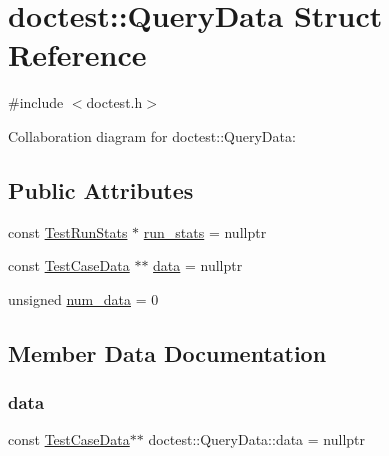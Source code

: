 \hypertarget{structdoctest_1_1_query_data}{}\section{doctest\+:\+:Query\+Data Struct Reference}
\label{structdoctest_1_1_query_data}


{\ttfamily \#include $<$doctest.\+h$>$}



Collaboration diagram for doctest\+:\+:Query\+Data\+:
\subsection*{Public Attributes}
\begin{DoxyCompactItemize}
\item 
const \hyperlink{structdoctest_1_1_test_run_stats}{Test\+Run\+Stats} $\ast$ \hyperlink{structdoctest_1_1_query_data_a435f443f389323f47cb8b0e4202bbea9}{run\+\_\+stats} = nullptr
\item 
const \hyperlink{structdoctest_1_1_test_case_data}{Test\+Case\+Data} $\ast$$\ast$ \hyperlink{structdoctest_1_1_query_data_a8085a29db9a1cd5c7eff22ef44e9a9e8}{data} = nullptr
\item 
unsigned \hyperlink{structdoctest_1_1_query_data_af1033338fe975ae3c19b16452401230d}{num\+\_\+data} = 0
\end{DoxyCompactItemize}


\subsection{Member Data Documentation}
\mbox{\label{structdoctest_1_1_query_data_a8085a29db9a1cd5c7eff22ef44e9a9e8}} 
\subsubsection{\texorpdfstring{data}{data}}
{\footnotesize\ttfamily const \hyperlink{structdoctest_1_1_test_case_data}{Test\+Case\+Data}$\ast$$\ast$ doctest\+::\+Query\+Data\+::data = nullptr}

\mbox{\label{structdoctest_1_1_query_data_af1033338fe975ae3c19b16452401230d}} 
